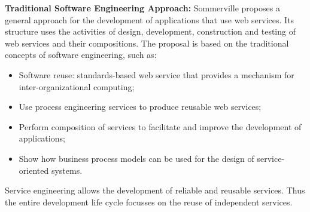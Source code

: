 % 
% 
% 
% 

\bigskip
\textbf{Traditional Software Engineering Approach:} Sommerville
\cite{sommerville08} proposes a general approach for the development of applications that use web services. Its
structure uses the activities of design, development, construction and testing of web services and their
compositions. The proposal is based on the traditional concepts of software
engineering, such as:
 
\begin{itemize}
  \item Software reuse: standards-based web service that provides a mechanism
  for inter-organizational computing;
  \item Use process engineering services to produce reusable web services;
  \item Perform composition of services to facilitate and improve the
  development of applications;
  \item Show how business process models can be used for the design of
  service-oriented systems.
\end{itemize}

Service engineering allows the development of reliable and
reusable services. Thus the entire development life cycle focusses on the
reuse of independent services. 

